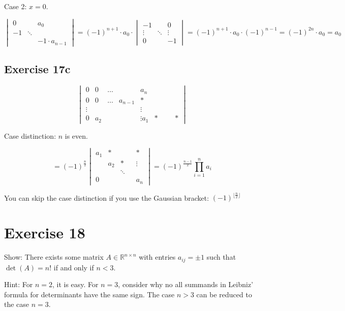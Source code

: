 \documentclass[a4paper]{article}
\theoremstyle{definition}
\begin{document}
Case 2: $x = 0$.

\[
  \begin{vmatrix}
    0 &         & a_0 \\
    -1 & \ddots & \\
       &        & -1\cdot a_{n-1}
  \end{vmatrix}
  = (-1)^{n+1} \cdot a_0 \cdot
  \begin{vmatrix}
    -1     &        & 0 \\
    \vdots & \ddots & \vdots \\
    0      &        & -1
  \end{vmatrix}
  = (-1)^{n+1} \cdot a_0 \cdot (-1)^{n-1} = (-1)^{2n} \cdot a_0 = a_0
\]

\subsection{Exercise 17c}
\begin{ex}
  \[
    \begin{vmatrix}
      0 & 0 & \ldots &         & a_n \\
      0 & 0 & \ldots & a_{n-1} & * \\
      \vdots & & & & \vdots \\
      0 & a_2 & & & \vdots
      a_1 & * & & & *
    \end{vmatrix}
  \]
\end{ex}

Case distinction: $n$ is even.

\[
  = (-1)^{\frac n2} \begin{vmatrix}
    a_1 & *   &   & & * \\
        & a_2 & * & & \vdots \\
        &     & \ddots & & \\
    0   &     &        & & a_n
  \end{vmatrix}
  = (-1)^{\frac{n-1}{2}} \prod_{i=1}^n a_i
\]

You can skip the case distinction if you use the Gaussian bracket: $(-1)^{\lfloor \frac n2\rfloor}$

\section*{Exercise 18}
\begin{ex}
  Show: There exists some matrix $A \in \mathbb R^{n\times n}$ with entries $a_{ij} = \pm 1$ such that $\det(A) = n!$ if and only if $n < 3$.

  Hint: For $n=2$, it is easy. For $n=3$, consider why no all summands in Leibniz' formula for determinants have the same sign. The case $n>3$ can be reduced to the case $n=3$.
\end{ex}
\end{document}
